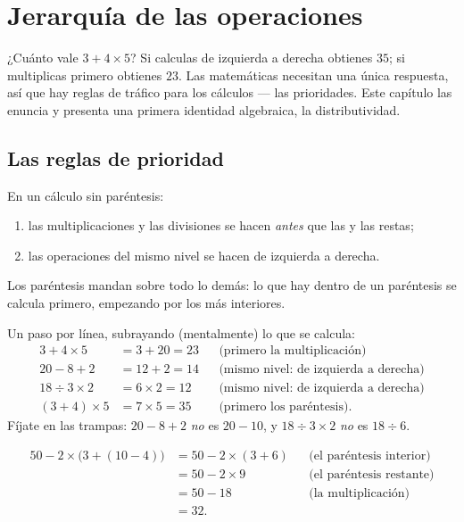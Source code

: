 \chapter{Jerarquía de las operaciones}\label{ch:g7:priorities}

¿Cuánto vale $3 + 4 \times 5$? Si calculas de izquierda a derecha obtienes $35$;
si multiplicas primero obtienes $23$. Las matemáticas necesitan una única
respuesta, así que hay reglas de tráfico para los cálculos --- las prioridades.
Este capítulo las enuncia y presenta una primera identidad algebraica,
la distributividad.

\section{Las reglas de prioridad}

\begin{theorem}\label{thm:g7:priorities:rules}
En un cálculo sin paréntesis:
\begin{enumerate}
  \item las multiplicaciones y las divisiones se hacen \emph{antes} que
        las  y las restas;
  \item las operaciones del mismo nivel se hacen de izquierda a derecha.
\end{enumerate}
Los paréntesis mandan sobre todo lo demás: lo que hay dentro de un paréntesis se calcula
primero, empezando por los más interiores.
\end{theorem}

\begin{example}\label{ex:g7:priorities:basic}
Un paso por línea, subrayando (mentalmente) lo que se calcula:
\begin{align*}
3 + 4 \times 5 &= 3 + 20 = 23
&&\text{(primero la multiplicación)}\\
20 - 8 + 2 &= 12 + 2 = 14
&&\text{(mismo nivel: de izquierda a derecha)}\\
18 \div 3 \times 2 &= 6 \times 2 = 12
&&\text{(mismo nivel: de izquierda a derecha)}\\
(3 + 4) \times 5 &= 7 \times 5 = 35
&&\text{(primero los paréntesis).}
\end{align*}
Fíjate en las trampas: $20 - 8 + 2$ \emph{no} es $20 - 10$, y
$18 \div 3 \times 2$ \emph{no} es $18 \div 6$.
\end{example}

\begin{example}\label{ex:g7:priorities:nested}
\begin{align*}
50 - 2 \times \bigl(3 + (10 - 4)\bigr)
&= 50 - 2 \times (3 + 6) && \text{(el paréntesis interior)}\\
&= 50 - 2 \times 9 && \text{(el paréntesis restante)}\\
&= 50 - 18 && \text{(la multiplicación)}\\
&= 32 .
\end{align*}
\end{example}

